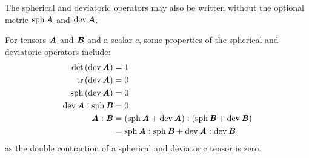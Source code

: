 The spherical and deviatoric operators may also be written without the
optional metric \ie $\spherical{}{\tensor{A}}$ and $\deviatoric{}{\tensor{A}}$.

For tensors $\boldsymbol{\mathit{A}}$ and $\boldsymbol{\mathit{B}}$ and a scalar $c$, some properties of
the spherical and deviatoric operators include:
\begin{align}
  \determinant{\pbrac{\deviatoric{}{\tensor{A}}}}&=1\\
  \trace{}{\pbrac{\deviatoric{}{\tensor{A}}}}&=0\\
  \spherical{}{\pbrac{\deviatoric{}{\tensor{A}}}}&=0\\
  \doubledotprod{\deviatoric{}{\tensor{A}}}{\spherical{}{\tensor{B}}}&=0 \\
  \doubledotprod{\tensor{A}}{\tensor{B}}&=\doubledotprod{\pbrac{\spherical{}{\tensor{A}}+\deviatoric{}{\tensor{A}}}}{\pbrac{\spherical{}{\tensor{B}}+\deviatoric{}{\tensor{B}}}}
  \notag \\
  &=\doubledotprod{\spherical{}{\tensor{A}}}{\spherical{}{\tensor{B}}}+\doubledotprod{\deviatoric{}{\tensor{A}}}{\deviatoric{}{\tensor{B}}}
\end{align}
as the double contraction of a spherical and deviatoric tensor is zero.

